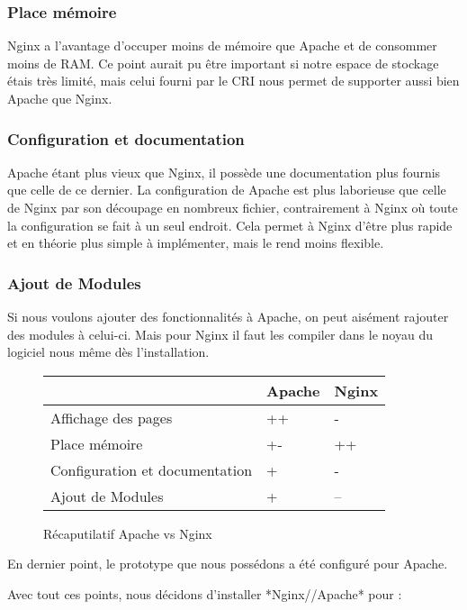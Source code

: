 \subsubsection{Place mémoire}
Nginx a l'avantage d'occuper moins de mémoire que Apache et de consommer moins de RAM.
Ce point aurait pu être important si notre espace de stockage étais très limité, mais celui fourni par le CRI nous permet de supporter aussi bien Apache que Nginx.

\subsubsection{Configuration et documentation}
Apache étant plus vieux que Nginx, il possède une documentation plus fournis que celle de ce dernier.
La configuration de Apache est plus laborieuse que celle de Nginx par son découpage en nombreux fichier, contrairement à Nginx où toute la configuration se fait à un seul endroit.
Cela permet à Nginx d'être plus rapide et en théorie plus simple à implémenter, mais le rend moins flexible.

\subsubsection{Ajout de Modules}
Si nous voulons ajouter des fonctionnalités à Apache, on peut aisément rajouter des modules à celui-ci. Mais pour Nginx il faut les compiler dans le noyau du logiciel nous même dès l'installation.

\begin{figure}[H]
\begin{center}
\begin{tabular}{|m{175pt}|m{50pt}|m{50pt}|}
	\hline
	\null & \textbf{Apache} & \textbf{Nginx} \\
	\hline
	Affichage des pages & ++ & -\\
	\hline
	Place mémoire & +- & ++\\
	\hline
	Configuration et documentation & + & - \\
	\hline
	Ajout de Modules & + & -- \\
	\hline
\end{tabular} \vspace*{5mm}
\caption{Récaputilatif Apache vs Nginx}
\end{center}
\end{figure}

En dernier point, le prototype que nous possédons a été configuré pour Apache.

Avec tout ces points, nous décidons d'installer *Nginx//Apache* pour :

